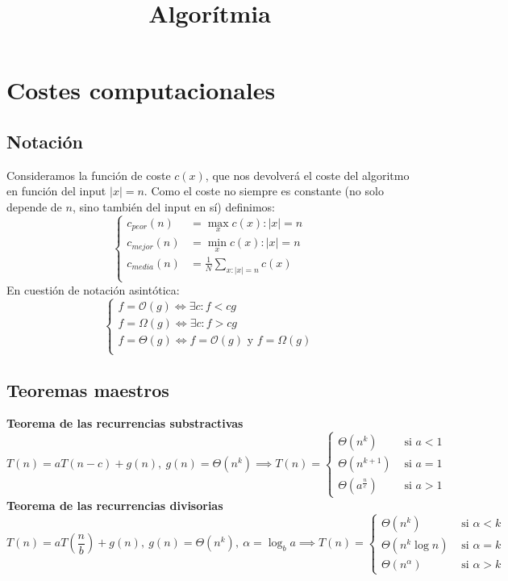 \documentclass{myclass}
\title{Algorítmia}
\begin{document}
\maketitle
\tableofcontents
\newpage

\section{Costes computacionales}
\subsection{Notación}
Consideramos la función de coste $c(x)$, que nos devolverá el coste del algoritmo en función del input $|x|=n$. Como el coste no siempre es constante (no solo depende de $n$, sino también del input en sí) definimos:
$$
\begin{cases}
c_{peor}(n) &= \max_x {c(x) : |x|=n} \\
c_{mejor}(n) &= \min_x {c(x) : |x|=n} \\
c_{media}(n) &= \frac{1}{N}\sum_{x:|x|=n} c(x) \\
\end{cases}
$$
En cuestión de notación asintótica:
$$
\begin{cases}
f = \mathcal{O}(g) \iff \exists c :f<cg \\ 
f = \Omega(g) \iff \exists c :f>cg \\ 
f = \Theta(g) \iff f=\mathcal{O}(g) \text{ y } f=\Omega(g) \\
\end{cases}
$$

\subsection{Teoremas maestros}
\textbf{Teorema de las recurrencias substractivas}
$$
T(n) = aT(n-c) + g(n), \ g(n) = \Theta(n^k) \implies T(n)=
\begin{cases}
\Theta(n^k) &\text{ si } a<1 \\
\Theta(n^{k+1}) &\text{ si } a=1 \\
\Theta(a^{\frac{n}{c}}) &\text{ si } a>1
\end{cases}
$$ \textbf{Teorema de las recurrencias divisorias}
$$
T(n) = aT\left(\frac{n}{b}\right) + g(n), \ g(n) = \Theta(n^k), \ \alpha = \log_ba \implies T(n)=
\begin{cases}
\Theta(n^k) &\text{ si } \alpha<k \\
\Theta(n^{k}\log n) &\text{ si } \alpha=k \\
\Theta(n^\alpha) &\text{ si } \alpha>k
\end{cases}
$$
\end{document}
